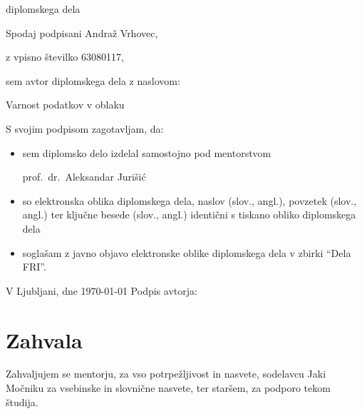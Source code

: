 \documentclass[12pt,a4paper,openany,tikz]{book}
\theoremstyle{plain}
\theoremstyle{definition}
\begin{document}
\begin{center}
{\Large diplomskega dela}
\end{center}

\vspace{1cm}
Spodaj podpisani \hspace{0.5cm} Andraž Vrhovec,

\vspace{0.5cm}
z vpisno številko \hspace{0.5cm} 63080117,

\vspace{1cm}
sem avtor diplomskega dela z naslovom:

\vspace{0.5cm}
\begin{center}
Varnost podatkov v oblaku
\end{center}

\vspace{1.5cm}
S svojim podpisom zagotavljam, da:
\begin{itemize}
	\item sem diplomsko delo izdelal samostojno pod mentorstvom

	prof.\ dr.\ Aleksandar Jurišić

	\item	so elektronska oblika diplomskega dela, naslov (slov., angl.), povzetek (slov., angl.) ter ključne besede (slov., angl.) identični s tiskano obliko diplomskega dela
	\item soglašam z javno objavo elektronske oblike diplomskega dela v zbirki ``Dela FRI''.
\end{itemize}

\vspace{1cm}
V Ljubljani, dne \today \hspace{1cm} Podpis avtorja:

\cleardoublepage
\chapter*{Zahvala}

Zahvaljujem se mentorju, za vso potrpežljivost in nasvete, sodelavcu Jaki Močniku za vsebinske in slovnične nasvete, ter staršem, za podporo tekom študija.

\tableofcontents


{\let\cleardoublepage\clearpage
\setcounter{page}{1}
\glsaddall{}
\printglossary[title=Slovarček]{}
\printglossary[type=\acronymtype,title=Seznam kratic in okrajšav]{}
}
\end{document}
